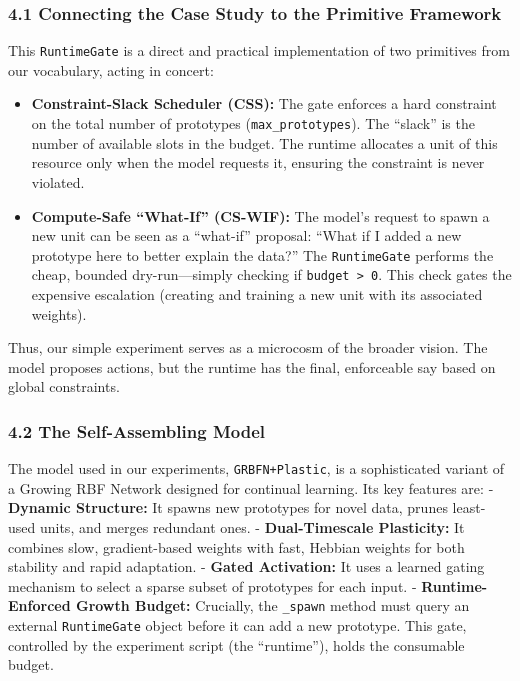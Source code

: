 \documentclass[
]{article}
\providecommand{\tightlist}{%
  \setlength{\itemsep}{0pt}\setlength{\parskip}{0pt}}
\begin{document}
\hypertarget{connecting-the-case-study-to-the-primitive-framework}{%
\subsubsection{4.1 Connecting the Case Study to the Primitive
Framework}\label{connecting-the-case-study-to-the-primitive-framework}}

This \texttt{RuntimeGate} is a direct and practical implementation of
two primitives from our vocabulary, acting in concert:

\begin{itemize}
\tightlist
\item
  \textbf{Constraint-Slack Scheduler (CSS):} The gate enforces a hard
  constraint on the total number of prototypes
  (\texttt{max\_prototypes}). The ``slack'' is the number of available
  slots in the budget. The runtime allocates a unit of this resource
  only when the model requests it, ensuring the constraint is never
  violated.
\item
  \textbf{Compute-Safe ``What-If'' (CS-WIF):} The model's request to
  spawn a new unit can be seen as a ``what-if'' proposal: ``What if I
  added a new prototype here to better explain the data?'' The
  \texttt{RuntimeGate} performs the cheap, bounded dry-run---simply
  checking if \texttt{budget\ \textgreater{}\ 0}. This check gates the
  expensive escalation (creating and training a new unit with its
  associated weights).
\end{itemize}

Thus, our simple experiment serves as a microcosm of the broader vision.
The model proposes actions, but the runtime has the final, enforceable
say based on global constraints.

\hypertarget{the-self-assembling-model}{%
\subsubsection{4.2 The Self-Assembling
Model}\label{the-self-assembling-model}}

The model used in our experiments, \texttt{GRBFN+Plastic}, is a
sophisticated variant of a Growing RBF Network designed for continual
learning. Its key features are: - \textbf{Dynamic Structure:} It spawns
new prototypes for novel data, prunes least-used units, and merges
redundant ones. - \textbf{Dual-Timescale Plasticity:} It combines slow,
gradient-based weights with fast, Hebbian weights for both stability and
rapid adaptation. - \textbf{Gated Activation:} It uses a learned gating
mechanism to select a sparse subset of prototypes for each input. -
\textbf{Runtime-Enforced Growth Budget:} Crucially, the \texttt{\_spawn}
method must query an external \texttt{RuntimeGate} object before it can
add a new prototype. This gate, controlled by the experiment script (the
``runtime''), holds the consumable budget.
\end{document}
